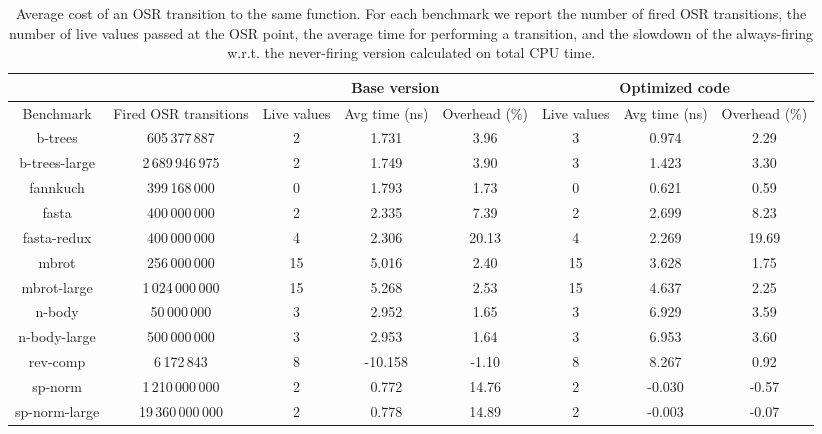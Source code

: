 \begin{table} 
\begin{center}
\begin{small}
    \begin{tabular}{ |c|c|c|c|c|c|c|c| }
        \cline{3-8}
        \multicolumn{2}{c|}{} & \multicolumn{3}{c|}{Base version} & \multicolumn{3}{c|}{Optimized code} \\
        \hline
        Benchmark & Fired OSR transitions & Live values & Avg time (ns) & Overhead (\%) & Live values & Avg time (ns) & Overhead (\%) \\ 
        \hline
        \hline
        b-trees & 605\,377\,887 & 2 & 1.731 & 3.96 & 3 & 0.974 & 2.29 \\ 
        \hline
        b-trees-large & 2\,689\,946\,975 & 2 & 1.749 & 3.90 & 3 & 1.423 & 3.30 \\ 
        \hline
        fannkuch & 399\,168\,000 & 0 & 1.793 & 1.73 & 0 & 0.621 & 0.59 \\ 
        \hline
        fasta & 400\,000\,000 & 2 & 2.335 & 7.39 & 2 & 2.699 & 8.23 \\ 
        \hline
        fasta-redux & 400\,000\,000 & 4 & 2.306 & 20.13 & 4 & 2.269 & 19.69 \\ 
        \hline
        mbrot & 256\,000\,000 & 15 & 5.016 & 2.40 & 15 & 3.628 & 1.75 \\ 
        \hline
        mbrot-large & 1\,024\,000\,000 & 15 & 5.268 & 2.53 & 15 & 4.637 & 2.25 \\ 
        \hline
        n-body & 50\,000\,000 & 3 & 2.952 & 1.65 & 3 & 6.929 & 3.59 \\ 
        \hline
        n-body-large & 500\,000\,000 & 3 & 2.953 & 1.64 & 3 & 6.953 & 3.60 \\ 
        \hline
        rev-comp & 6\,172\,843 & 8 & -10.158 & -1.10 & 8 & 8.267 & 0.92 \\ 
        \hline
        sp-norm & 1\,210\,000\,000 & 2 & 0.772 & 14.76 & 2 & -0.030 & -0.57 \\ 
        \hline 
        sp-norm-large & 19\,360\,000\,000 & 2 & 0.778 & 14.89 & 2 & -0.003 & -0.07 \\
        \hline
    \end{tabular} 
\end{small}
\end{center}
\caption{\label{tab:sameFun}Average cost of an OSR transition to the same function. For each benchmark we report the number of fired OSR transitions, the number of live values passed at the OSR point, the average time for performing a transition, and the slowdown of the always-firing w.r.t. the never-firing version calculated on total CPU time. } 
\end{table}

